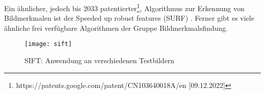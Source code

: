 Ein ähnlicher, jedoch bis 2033 patentierter\footnote{https://patents.google.com/patent/CN103640018A/en [09.12.2022]}, Algorithmus zur Erkennung von Bildmerkmalen ist der
\glqq{}Speeded up robust features (SURF)\grqq{} \parencite{sift-surf}. Ferner
gibt es viele ähnliche frei verfügbare Algorithmen der Gruppe
\glqq{}Bildmerkmalsfindung\grqq{}.

\begin{figure}[H]
    \centering
    \texttt{[image: sift]}
    \caption{SIFT: Anwendung an verschiedenen Testbildern}
    \label{fig:sift}
\end{figure}
